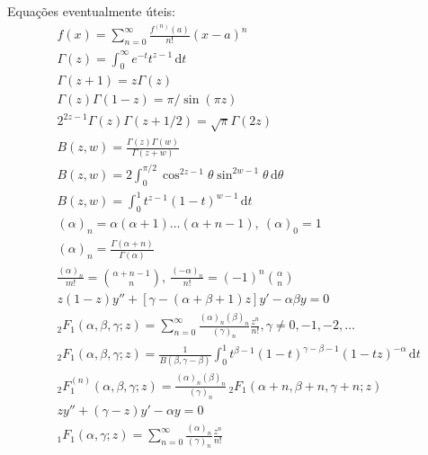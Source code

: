 \documentclass[a4paper,12pt, leqno, answers]{exam}
\begin{document}
\thispagestyle{empty}

\newpage
\setcounter{page}{1}
Equa\c{c}\~{o}es eventualmente úteis:
\begin{align}
    & f(x) = \sum_{n = 0}^\infty \frac{f^{(n)}(a)}{n!} (x - a)^n \tag{ST} \label{eq:ser_taylor} \\
    & \Gamma(z) = \int_0^\infty e^{-t} t^{z - 1} \,\mathrm{d}t \tag{GE} \label{eq:gamma_euler} \\
    & \Gamma(z + 1) = z \Gamma(z) \label{eq:gamma_rel} \\
    & \Gamma(z) \Gamma(1 - z) = \pi / \sin(\pi z) \label{eq:gamma_sin} \\
    & 2^{2 z - 1} \Gamma(z) \Gamma(z + 1/2) = \sqrt{\pi} \Gamma(2 z) \label{eq:gamma_dup_legendre} \\
    & B(z, w) = \frac{\Gamma(z) \Gamma(w)}{\Gamma(z + w)} \tag{BG} \label{eq:beta} \\
    & B(z, w) = 2 \int_0^{\pi / 2} \cos^{2z - 1} \theta \sin^{2w - 1} \theta \,\mathrm{d}\theta \tag{BT} \label{eq:beta_trig} \\
    & B(z, w) = \int_0^1 t^{z - 1} (1 - t)^{w - 1} \,\mathrm{d}t \tag{BI} \label{eq:beta_int} \\
    & (\alpha)_n = \alpha (\alpha + 1) \ldots (\alpha + n - 1), \ (\alpha)_0 = 1 \tag{SP} \label{eq:sim_poch} \\
    & (\alpha)_n = \frac{\Gamma(\alpha + n)}{\Gamma(\alpha)} \label{eq:sim_poch_gamma} \\
    & \frac{(\alpha)_n}{m!} = \binom{\alpha + n - 1}{n}, \ \frac{(-\alpha)_n}{n!} = (-1)^n \binom{\alpha}{n} \label{eq:sim_poch_binom} \\
    & z(1 - z)y'' + \left[ \gamma - (\alpha + \beta + 1) z \right] y' - \alpha \beta y = 0 \tag{EH} \label{eq:hiperg} \\
    & {}_2F_1(\alpha, \beta, \gamma; z) = \sum_{n = 0}^\infty \frac{(\alpha)_n (\beta)_n}{(\gamma)_n} \frac{z^n}{n!}, \gamma \neq 0, -1, -2, \ldots \tag{RSHF} \label{eq:hiperg_ser} \\
    & {}_2F_1(\alpha, \beta, \gamma; z) = \frac{1}{B(\beta, \gamma - \beta)} \int_0^1 t^{\beta - 1} (1- t)^{\gamma - \beta - 1} (1 - tz)^{-\alpha} \,\mathrm{d}t \tag{RIFH}\label{eq:hiperg_int} \\
    & {}_2F_1^{(n)}(\alpha, \beta, \gamma; z) = \frac{(\alpha)_n (\beta)_n}{(\gamma)_n} \,{}_2F_1(\alpha + n, \beta + n, \gamma + n; z) \label{eq:hiperg_der} \\
    & zy'' + (\gamma - z)y' - \alpha y = 0 \tag{EHC} \label{eq:hiper_con} \\
    & {}_1F_1(\alpha, \gamma; z) = \sum_{n = 0}^\infty \frac{(\alpha)_n}{(\gamma)_n} \frac{z^n}{n!} \tag{RSFHC} \label{eq:hiperg_con_ser}
\end{align}
\end{document}

